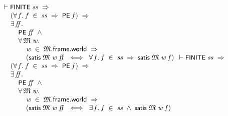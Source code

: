 \documentclass[letterpaper]{article}
\renewcommand{\HOLConst}[1]{{\textsf{\upshape\small #1}}}
\newenvironment{holmath}{\begin{displaymath}\begin{array}{l}}{\end{array}\end{displaymath}\ignorespacesafterend}
\begin{document}
\begin{holmath}
  \ensuremath{\HOLTokenTurnstile}\HOLConst{FINITE}\;\HOLFreeVar{ss}\;\HOLSymConst{\HOLTokenImp{}}\\
\;\;\;\;\;(\HOLSymConst{\HOLTokenForall{}}\HOLBoundVar{f}.\;\HOLBoundVar{f}\;\HOLSymConst{\HOLTokenIn{}}\;\HOLFreeVar{ss}\;\HOLSymConst{\HOLTokenImp{}}\;\HOLConst{PE}\;\HOLBoundVar{f})\;\HOLSymConst{\HOLTokenImp{}}\\
\;\;\;\;\;\HOLSymConst{\HOLTokenExists{}}\HOLBoundVar{ff}.\\
\;\;\;\;\;\;\;\;\;\HOLConst{PE}\;\HOLBoundVar{ff}\;\HOLSymConst{\HOLTokenConj{}}\\
\;\;\;\;\;\;\;\;\;\HOLSymConst{\HOLTokenForall{}}\HOLBoundVar{\ensuremath{\mathfrak{M}}}\;\HOLBoundVar{w}.\\
\;\;\;\;\;\;\;\;\;\;\;\;\;\HOLBoundVar{w}\;\HOLSymConst{\HOLTokenIn{}}\;\HOLBoundVar{\ensuremath{\mathfrak{M}}}.\HOLFieldName{frame}.\HOLFieldName{world}\;\HOLSymConst{\HOLTokenImp{}}\\
\;\;\;\;\;\;\;\;\;\;\;\;\;(\HOLConst{satis}\;\HOLBoundVar{\ensuremath{\mathfrak{M}}}\;\HOLBoundVar{w}\;\HOLBoundVar{ff}\;\HOLSymConst{\HOLTokenEquiv{}}\;\HOLSymConst{\HOLTokenForall{}}\HOLBoundVar{f}.\;\HOLBoundVar{f}\;\HOLSymConst{\HOLTokenIn{}}\;\HOLFreeVar{ss}\;\HOLSymConst{\HOLTokenImp{}}\;\HOLConst{satis}\;\HOLBoundVar{\ensuremath{\mathfrak{M}}}\;\HOLBoundVar{w}\;\HOLBoundVar{f})
  \ensuremath{\HOLTokenTurnstile}\HOLConst{FINITE}\;\HOLFreeVar{ss}\;\HOLSymConst{\HOLTokenImp{}}\\
\;\;\;\;\;(\HOLSymConst{\HOLTokenForall{}}\HOLBoundVar{f}.\;\HOLBoundVar{f}\;\HOLSymConst{\HOLTokenIn{}}\;\HOLFreeVar{ss}\;\HOLSymConst{\HOLTokenImp{}}\;\HOLConst{PE}\;\HOLBoundVar{f})\;\HOLSymConst{\HOLTokenImp{}}\\
\;\;\;\;\;\HOLSymConst{\HOLTokenExists{}}\HOLBoundVar{ff}.\\
\;\;\;\;\;\;\;\;\;\HOLConst{PE}\;\HOLBoundVar{ff}\;\HOLSymConst{\HOLTokenConj{}}\\
\;\;\;\;\;\;\;\;\;\HOLSymConst{\HOLTokenForall{}}\HOLBoundVar{\ensuremath{\mathfrak{M}}}\;\HOLBoundVar{w}.\\
\;\;\;\;\;\;\;\;\;\;\;\;\;\HOLBoundVar{w}\;\HOLSymConst{\HOLTokenIn{}}\;\HOLBoundVar{\ensuremath{\mathfrak{M}}}.\HOLFieldName{frame}.\HOLFieldName{world}\;\HOLSymConst{\HOLTokenImp{}}\\
\;\;\;\;\;\;\;\;\;\;\;\;\;(\HOLConst{satis}\;\HOLBoundVar{\ensuremath{\mathfrak{M}}}\;\HOLBoundVar{w}\;\HOLBoundVar{ff}\;\HOLSymConst{\HOLTokenEquiv{}}\;\HOLSymConst{\HOLTokenExists{}}\HOLBoundVar{f}.\;\HOLBoundVar{f}\;\HOLSymConst{\HOLTokenIn{}}\;\HOLFreeVar{ss}\;\HOLSymConst{\HOLTokenConj{}}\;\HOLConst{satis}\;\HOLBoundVar{\ensuremath{\mathfrak{M}}}\;\HOLBoundVar{w}\;\HOLBoundVar{f})
\end{holmath}
\end{document}
